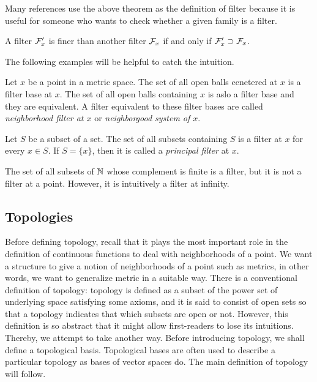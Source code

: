 Many references use the above theorem as the definition of filter because it is useful for someone who wants to check whether a given family is a filter.

\begin{thm}
A filter $\mathcal{F}'_x$ is finer than another filter $\mathcal{F}_x$ if and only if $\mathcal{F}'_x\supset\mathcal{F}_x$.
\end{thm}
\begin{pf}
\end{pf}

The following examples will be helpful to catch the intuition.

\begin{ex}\label{ex:neighborhood filter is a filter}
Let $x$ be a point in a metric space.
The set of all open balls cenetered at $x$ is a filter base at $x$.
The set of all open balls containing $x$ is aslo a filter base and they are equivalent.
A filter equivalent to these filter bases are called \emph{neighborhood filter at $x$} or \emph{neighborgood system of $x$}.
\end{ex}
\begin{ex}
Let $S$ be a subset of a set.
The set of all subsets containing $S$ is a filter at $x$ for every $x\in S$.
If $S=\{x\}$, then it is called a \emph{principal filter} at $x$.
\end{ex}
\begin{ex}
The set of all subsets of $\mathbb{N}$ whose complement is finite is a filter, but it is not a filter at a point.
However, it is intuitively a filter at infinity.
\end{ex}






\subsection{Topologies}
Before defining topology, recall that it plays the most important role in the definition of continuous functions to deal with neighborhoods of a point.
We want a structure to give a notion of neighborhoods of a point such as metrics, in other words, we want to generalize metric in a suitable way.
There is a conventional definition of topology: topology is defined as a subset of the power set of underlying space satisfying some axioms, and it is said to consist of open sets so that a topology indicates that which subsets are open or not.
However, this definition is so abstract that it might allow first-readers to lose its intuitions.
Thereby, we attempt to take another way.
Before introducing topology, we shall define a topological basis.
Topological bases are often used to describe a particular topology as bases of vector spaces do.
The main definition of topology will follow.

